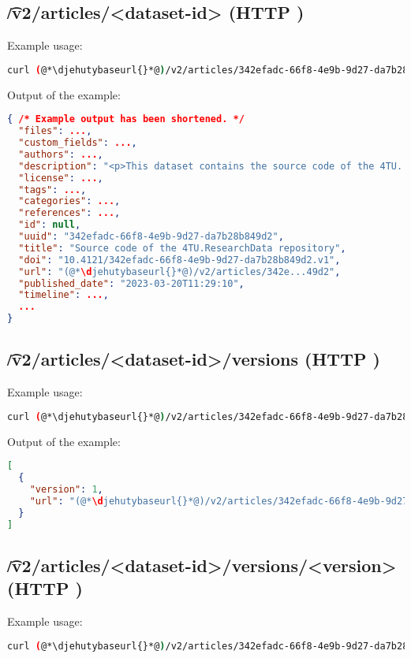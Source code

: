 \subsection{\t{/v2/articles/<dataset-id>} (HTTP )}
\label{sec:v2-articles-dataset-id}
  Example usage:
\begin{lstlisting}[language=bash]
curl (@*\djehutybaseurl{}*@)/v2/articles/342efadc-66f8-4e9b-9d27-da7b28b849d2 | jq
\end{lstlisting}

  Output of the example:
\begin{lstlisting}[language=JSON]
{ /* Example output has been shortened. */
  "files": ...,
  "custom_fields": ...,
  "authors": ...,
  "description": "<p>This dataset contains the source code of the 4TU...",
  "license": ...,
  "tags": ...,
  "categories": ...,
  "references": ...,
  "id": null,
  "uuid": "342efadc-66f8-4e9b-9d27-da7b28b849d2",
  "title": "Source code of the 4TU.ResearchData repository",
  "doi": "10.4121/342efadc-66f8-4e9b-9d27-da7b28b849d2.v1",
  "url": "(@*\djehutybaseurl{}*@)/v2/articles/342e...49d2",
  "published_date": "2023-03-20T11:29:10",
  "timeline": ...,
  ...
}
\end{lstlisting}

\subsection{\t{/v2/articles/<dataset-id>/versions} (HTTP )}

  Example usage:
\begin{lstlisting}[language=bash]
curl (@*\djehutybaseurl{}*@)/v2/articles/342efadc-66f8-4e9b-9d27-da7b28b849d2/versions | jq
\end{lstlisting}

  Output of the example:
\begin{lstlisting}[language=JSON]
[
  {
    "version": 1,
    "url": "(@*\djehutybaseurl{}*@)/v2/articles/342efadc-66f8-4e9b-9d27-da7b28b849d2/versions/1"
  }
]
\end{lstlisting}

\subsection{\t{/v2/articles/<dataset-id>/versions/<version>} (HTTP )}

  Example usage:
\begin{lstlisting}[language=bash]
curl (@*\djehutybaseurl{}*@)/v2/articles/342efadc-66f8-4e9b-9d27-da7b28b849d2/versions/1 | jq
\end{lstlisting}

